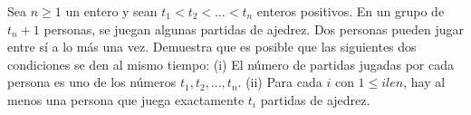 Sea $n \ge 1$ un entero y sean $t_1 \lt t_2 \lt \dots \lt t_n$ enteros positivos. En un grupo de
$t_n + 1$ personas, se juegan algunas partidas de ajedrez. Dos personas pueden jugar entre sí a lo más
una vez. Demuestra que es posible que las siguientes dos condiciones se den al mismo tiempo:
(i) El número de partidas jugadas por cada persona es uno de los números $t_1, t_2, . . . , t_n$.
(ii) Para cada $i$ con $1 \le i le n$, hay al menos una persona que juega exactamente $t_i$ partidas de
ajedrez.